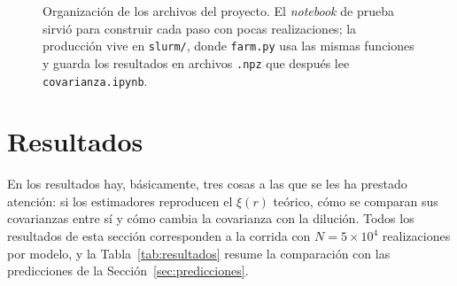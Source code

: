 \documentclass[letterpaper, 12pt]{article}
\begin{document}
            \begin{figure}[H]
                \centering
                \begin{minipage}{0.92\linewidth}
                \end{minipage}
                \caption{Organización de los archivos del proyecto. El \emph{notebook} de prueba sirvió para construir cada paso con pocas realizaciones; la producción vive en \texttt{slurm/}, donde \texttt{farm.py} usa las mismas funciones y guarda los resultados en archivos \texttt{.npz} que después lee \texttt{covarianza.ipynb}.}
                \label{fig:directorio}
            \end{figure}

    \section{Resultados}\label{sec:resultados}

        En los resultados hay, básicamente, tres cosas a las que se les ha prestado atención: si los estimadores reproducen el $\xi(r)$ teórico, cómo se comparan sus covarianzas entre sí y cómo cambia la covarianza con la dilución. Todos los resultados de esta sección corresponden a la corrida con $N = 5\times10^4$ realizaciones por modelo, y la Tabla~\ref{tab:resultados} resume la comparación con las predicciones de la Sección~\ref{sec:predicciones}.
\end{document}
